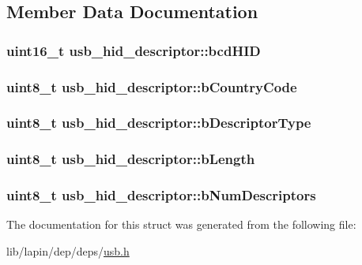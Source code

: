 \subsection{Member Data Documentation}
\hypertarget{structusb__hid__descriptor_af5ba1299c6b42c862f2f3e478173218d}{
\subsubsection[{bcd\-H\-I\-D}]{\setlength{\rightskip}{0pt plus 5cm}uint16\-\_\-t usb\-\_\-hid\-\_\-descriptor\-::bcd\-H\-I\-D}}\label{structusb__hid__descriptor_af5ba1299c6b42c862f2f3e478173218d}
\hypertarget{structusb__hid__descriptor_a143eb3e58466e54c19c1b9ab8a31ac6f}{
\subsubsection[{b\-Country\-Code}]{\setlength{\rightskip}{0pt plus 5cm}uint8\-\_\-t usb\-\_\-hid\-\_\-descriptor\-::b\-Country\-Code}}\label{structusb__hid__descriptor_a143eb3e58466e54c19c1b9ab8a31ac6f}
\hypertarget{structusb__hid__descriptor_a01533992789ba6c7306e0f97c1c01765}{
\subsubsection[{b\-Descriptor\-Type}]{\setlength{\rightskip}{0pt plus 5cm}uint8\-\_\-t usb\-\_\-hid\-\_\-descriptor\-::b\-Descriptor\-Type}}\label{structusb__hid__descriptor_a01533992789ba6c7306e0f97c1c01765}
\hypertarget{structusb__hid__descriptor_adedc57a5e5e9873d1cb7d00d69bfe1c7}{
\subsubsection[{b\-Length}]{\setlength{\rightskip}{0pt plus 5cm}uint8\-\_\-t usb\-\_\-hid\-\_\-descriptor\-::b\-Length}}\label{structusb__hid__descriptor_adedc57a5e5e9873d1cb7d00d69bfe1c7}
\hypertarget{structusb__hid__descriptor_a0f0d0cf9739138f069273f284490e0d8}{
\subsubsection[{b\-Num\-Descriptors}]{\setlength{\rightskip}{0pt plus 5cm}uint8\-\_\-t usb\-\_\-hid\-\_\-descriptor\-::b\-Num\-Descriptors}}\label{structusb__hid__descriptor_a0f0d0cf9739138f069273f284490e0d8}


The documentation for this struct was generated from the following file\-:\begin{DoxyCompactItemize}
\item 
lib/lapin/dep/deps/\hyperlink{deps_2usb_8h}{usb.\-h}\end{DoxyCompactItemize}
